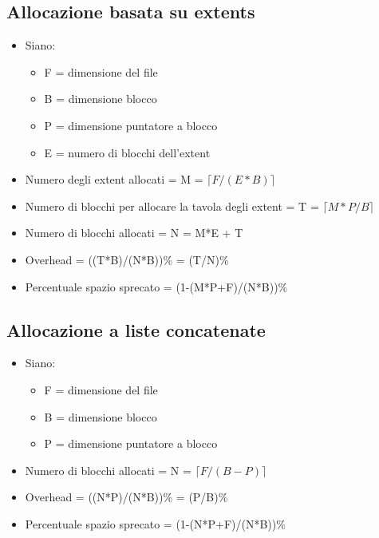 \documentclass[10pt]{article}
\begin{document}
\subsection*{Allocazione basata su extents}
\begin{itemize}
    \item Siano:
    \begin{itemize}
        \item F = dimensione del file
        \item B = dimensione blocco
        \item P = dimensione puntatore a blocco
        \item E = numero di blocchi dell'extent
    \end{itemize}
    \item Numero degli extent allocati = M = $\lceil F/(E*B) \rceil$
    \item Numero di blocchi per allocare la tavola degli extent = T = $\lceil M*P/B \rceil$
    \item Numero di blocchi allocati = N = M*E + T
    \item Overhead = ((T*B)/(N*B))\% = (T/N)\%
    \item Percentuale spazio sprecato = (1-(M*P+F)/(N*B))\%
\end{itemize}
\subsection*{Allocazione a liste concatenate}
\begin{itemize}
    \item Siano:
    \begin{itemize}
        \item F = dimensione del file
        \item B = dimensione blocco
        \item P = dimensione puntatore a blocco
    \end{itemize}
    \item Numero di blocchi allocati = N = $\lceil F/(B-P) \rceil$
    \item Overhead = ((N*P)/(N*B))\% = (P/B)\%
    \item Percentuale spazio sprecato = (1-(N*P+F)/(N*B))\%
\end{itemize}
\end{document}
